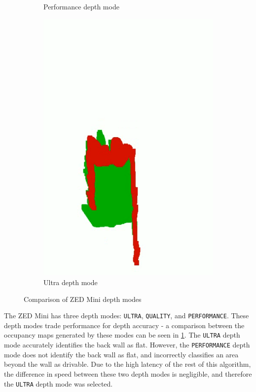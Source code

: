 \begin{figure}[p]
\begin{subfigure}{.2\textwidth}
        \caption{Performance depth mode}
    \end{subfigure}
    \begin{subfigure}{.2\textwidth}
        \centering
        \includegraphics[width=\linewidth,frame]{images/pcloud_indoor_ultra.PNG}
        \caption{Ultra depth mode}
    \end{subfigure}
    \caption{Comparison of ZED Mini depth modes}
    \label{fig:depth_mode_comparison}
\end{figure}\clearpage

The ZED Mini has three depth modes: \texttt{ULTRA}, \texttt{QUALITY}, and \texttt{PERFORMANCE}.
These depth modes trade performance for depth accuracy - a comparison between the occupancy maps
generated by these modes can be seen in \cref{fig:depth_mode_comparison}.
The \texttt{ULTRA} depth mode accurately identifies the back wall as flat.
However, the \texttt{PERFORMANCE} depth mode does not identify the back wall
as flat, and incorrectly classifies an area beyond the wall as drivable.
Due to the high latency of the rest of this algorithm, the difference in speed between these two depth modes is negligible,
and therefore the \texttt{ULTRA} depth mode was selected.

